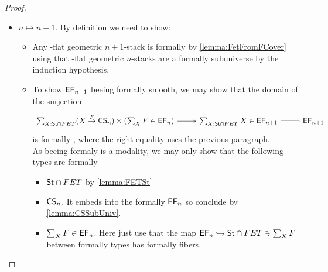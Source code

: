 \begin{proof}
\begin{itemize}
\begin{itemize}
		\end{itemize}
		\item $n \mapsto n+1$. By definition we need to show:
		\begin{itemize}
			\item Any \etale-flat geometric $n+1$-stack is formally \etale by \ref{lemma:FetFromFCover} using that \etale-flat geometric $n$-stacks are a formally \etale subuniverse by the induction hypothesis.
			\item To show $\mathsf{EF}_{n+1}$ beeing formally smooth, we may show \todocite that the domain of the surjection
			\[\begin{tikzcd}
				{\sum_{X : \St \cap FET}(X \overset{F}{\to} \CS_{n}) \times (\sum_{X} F \in \EF_n)} & {\sum_{X : \St \cap FET} X \in \EF_{n+1}} & {\EF_{n+1}}
				\arrow[two heads, from=1-1, to=1-2]
				\arrow[Rightarrow, no head, from=1-2, to=1-3]
			\end{tikzcd}\]
			is formally \etale, where the right equality uses the previous paragraph. \\
			As beeing formaly \etale is a modality, we may only show that the following types are formally \etale
			\begin{itemize}
				\item $\mathsf{St} \cap FET$ by \ref{lemma:FETSt}
				\item $\mathsf{CS}_n$. It embeds into the formally \etale $\mathsf{EF}_n$ so conclude by \ref{lemma:CSSubUniv}.
				\item $\sum_X F \in \mathsf{EF}_n$. Here just use that the map $\mathsf{EF}_n \hookrightarrow \mathsf{St} \cap FET \ni \sum_X F$ between formally \etale types has formally \etale fibers.
			\end{itemize} 
		\end{itemize}
	\end{itemize}
\end{proof}
